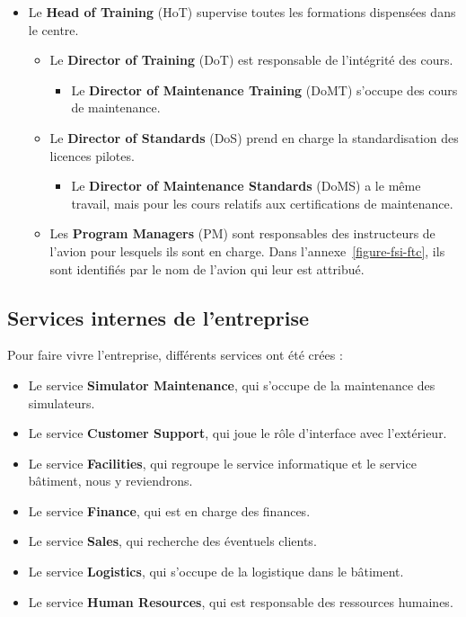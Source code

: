 \documentclass[a4paper,french,11pt,openany,oneside]{memoir}
\begin{document}
\begin{itemize}
	\item Le \textbf{Head of Training} (HoT) supervise toutes les formations dispensées dans le centre.
	\begin{itemize}
		\item Le \textbf{Director of Training} (DoT) est responsable de l'intégrité des cours.
		\begin{itemize}
			\item Le \textbf{Director of Maintenance Training} (DoMT) s'occupe des cours de maintenance.
		\end{itemize}

		\item Le \textbf{Director of Standards} (DoS) prend en charge la standardisation des licences pilotes.
		\begin{itemize}
			\item Le \textbf{Director of Maintenance Standards} (DoMS) a le même travail, mais pour les cours relatifs aux certifications de maintenance.
		\end{itemize}

		\item Les \textbf{Program Managers} (PM) sont responsables des instructeurs de l'avion pour lesquels ils sont en charge. Dans l'annexe~\ref{figure-fsi-ftc}, ils sont identifiés par le nom de l'avion qui leur est attribué.
	\end{itemize}
\end{itemize}

\subsection{Services internes de l'entreprise}

Pour faire vivre l'entreprise, différents services ont été crées : \\

\begin{itemize}
	\item Le service \textbf{Simulator Maintenance}, qui s'occupe de la maintenance des simulateurs.
	\item Le service \textbf{Customer Support}, qui joue le rôle d'interface avec l'extérieur.
	\item Le service \textbf{Facilities}, qui regroupe le service informatique et le service bâtiment, nous y reviendrons.
	\item Le service \textbf{Finance}, qui est en charge des finances.
	\item Le service \textbf{Sales}, qui recherche des éventuels clients.
	\item Le service \textbf{Logistics}, qui s'occupe de la logistique dans le bâtiment.
	\item Le service \textbf{Human Resources}, qui est responsable des ressources humaines.
\end{itemize}
\end{document}
